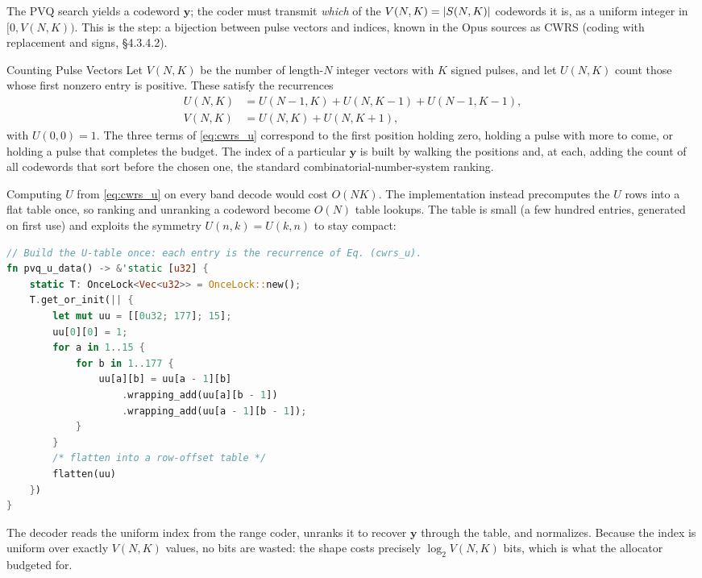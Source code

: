 The PVQ search yields a codeword $\mathbf{y}$; the coder must transmit \emph{which}
of the $V(N,K) = \lvert S(N,K)\rvert$ codewords it is, as a uniform integer in
$[0, V(N,K))$. This is the  step: a bijection between
pulse vectors and indices, known in the Opus sources as CWRS (coding with
replacement and signs, \S4.3.4.2).

\begin{concept}{Counting Pulse Vectors}
  Let $V(N, K)$ be the number of length-$N$ integer vectors with $K$ signed
  pulses, and let $U(N, K)$ count those whose first nonzero entry is positive.
  These satisfy the recurrences
  \begin{align}
    \label{eq:cwrs_u}
    U(N, K) &= U(N-1, K) + U(N, K-1) + U(N-1, K-1), \\
    \label{eq:cwrs_v}
    V(N, K) &= U(N, K) + U(N, K+1),
  \end{align}
  with $U(0,0) = 1$. The three terms of \cref{eq:cwrs_u} correspond to the first
  position holding zero, holding a pulse with more to come, or holding a pulse
  that completes the budget. The index of a particular $\mathbf{y}$ is built by
  walking the positions and, at each, adding the count of all codewords that
  sort before the chosen one, the standard combinatorial-number-system ranking.
\end{concept}

Computing $U$ from \cref{eq:cwrs_u} on every band decode would cost $O(NK)$. The
implementation instead precomputes the $U$ rows into a flat table once, so
ranking and unranking a codeword become $O(N)$ table lookups. The table is small
(a few hundred entries, generated on first use) and exploits the symmetry
$U(n,k)=U(k,n)$ to stay compact:

\begin{lstlisting}[language=Rust]
// Build the U-table once: each entry is the recurrence of Eq. (cwrs_u).
fn pvq_u_data() -> &'static [u32] {
    static T: OnceLock<Vec<u32>> = OnceLock::new();
    T.get_or_init(|| {
        let mut uu = [[0u32; 177]; 15];
        uu[0][0] = 1;
        for a in 1..15 {
            for b in 1..177 {
                uu[a][b] = uu[a - 1][b]
                    .wrapping_add(uu[a][b - 1])
                    .wrapping_add(uu[a - 1][b - 1]);
            }
        }
        /* flatten into a row-offset table */
        flatten(uu)
    })
}
\end{lstlisting}

The decoder reads the uniform index from the range coder, unranks it to recover
$\mathbf{y}$ through the table, and normalizes. Because the index is uniform over
exactly $V(N,K)$ values, no bits are wasted: the shape costs precisely
$\log_2 V(N,K)$ bits, which is what the allocator budgeted for.

